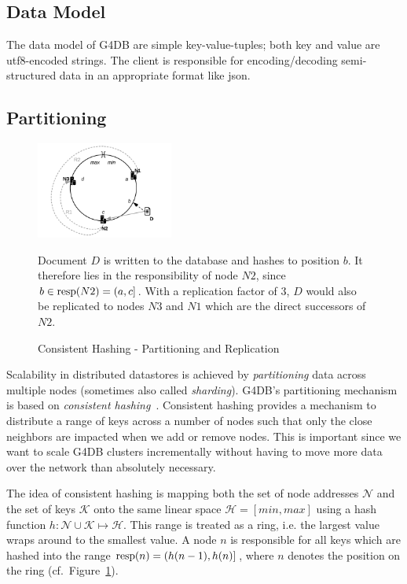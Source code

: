 \subsection{Data Model}

The data model of G4DB are simple key-value-tuples; both key and value are \acs{utf8}-encoded strings.
The client is responsible for encoding/decoding semi-structured data in an appropriate
format like \ac{json}.

\subsection{Partitioning}

\begin{figure}[]
	\includegraphics[width=0.4\textwidth]{resources/consistent-hashing-1}
	\caption{Consistent Hashing - Partitioning and Replication}
	\label{fig:consistent-hashing-partitioning}
	{
	Document $D$ is written to the database and hashes to position $b$.
	It therefore lies in the responsibility of node $N2$, since
	$b \in \operatorname{resp}(N2) = (a,c]$.
	With a replication factor of 3, $D$ would also be replicated to nodes
	$N3$ and $N1$ which are the direct successors of $N2$.
	}
\end{figure}

Scalability in distributed datastores is achieved by \emph{partitioning} data across
multiple nodes (sometimes also called \emph{sharding}). 
G4DB's partitioning mechanism is based on \emph{consistent hashing}~\cite[]{Karger1997}.
Consistent hashing provides a mechanism to distribute a range of keys across
a number of nodes such that only the close neighbors are impacted when we add or remove nodes.
This is important since we want to scale G4DB clusters incrementally without having
to move more data over the network than absolutely necessary.


The idea of consistent hashing is mapping
both the set of node addresses $\mathcal{N}$ and the set of keys $\mathcal{K}$
onto the same linear space $\mathcal{H} = [min,max]$
using a hash function $h: \mathcal{N} \cup \mathcal{K} \mapsto \mathcal{H}$.
This range is treated as a ring, i.e. the largest value wraps around to the smallest value.
A node $n$ is responsible for all keys which are hashed into the
range $\operatorname{resp}(n) = (h(n-1),h(n)]$, where $n$ denotes the position on the ring (cf.~Figure~\ref{fig:consistent-hashing-partitioning}).


